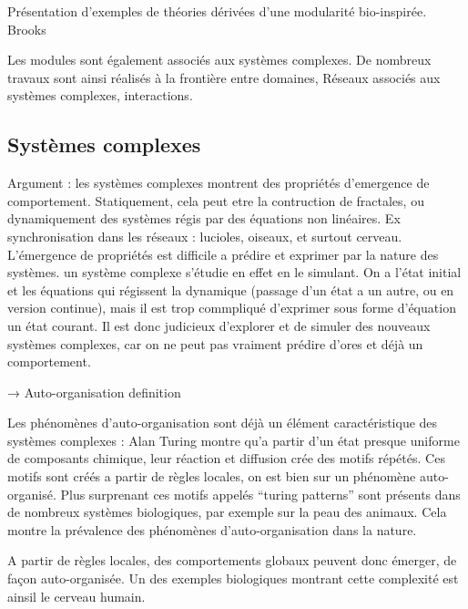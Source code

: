 Présentation d'exemples de théories dérivées d'une modularité bio-inspirée. 
Brooks \cite{brooks_sumsumption_85}

Les modules sont également associés aux systèmes complexes. De nombreux travaux sont ainsi réalisés à la frontière entre domaines, 
Réseaux associés aux systèmes complexes, interactions.


\subsection{Systèmes complexes}


Argument : les systèmes complexes montrent des propriétés d’emergence de comportement. Statiquement, cela peut etre la contruction de fractales, ou dynamiquement des systèmes régis par des équations non linéaires. Ex synchronisation dans les réseaux : lucioles, oiseaux, et surtout cerveau. L’émergence de propriétés est difficile a prédire et exprimer par la nature des systèmes. un système complexe s’étudie en effet en le simulant. On a l’état initial et les équations qui régissent la dynamique (passage d’un état a un autre, ou en version continue), mais il est trop commpliqué d’exprimer sous forme d’équation un état courant. 
Il est donc judicieux d’explorer et de simuler des nouveaux systèmes complexes, car on ne peut pas vraiment prédire d’ores et déjà un comportement. 

→ Auto-organisation definition

Les phénomènes d’auto-organisation sont déjà un élément caractéristique des systèmes complexes : Alan Turing montre qu’a partir d’un état presque uniforme de composants chimique, leur réaction et diffusion crée des motifs répétés. Ces motifs sont créés a partir de règles locales, on est bien sur un phénomène auto-organisé. Plus surprenant ces motifs appelés “turing patterns” sont présents dans de nombreux systèmes biologiques, par exemple sur la peau des animaux. Cela montre la prévalence des phénomènes d’auto-organisation dans la nature. 

A partir de règles locales, des comportements globaux peuvent donc émerger, de façon auto-organisée. Un des exemples biologiques montrant cette complexité est ainsil le cerveau humain. 



